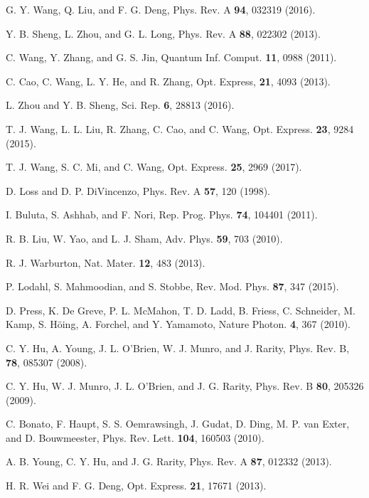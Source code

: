 \documentclass[aps,graphicx,twocolumn]{revtex4}%
\begin{document}
\begin{thebibliography}{199}
 G. Y. Wang, Q. Liu, and F. G. Deng,   Phys. Rev. A \textbf{94}, 032319 (2016).



Y. B. Sheng, L. Zhou, and G. L. Long,   Phys. Rev. A \textbf{88}, 022302 (2013).


C. Wang, Y. Zhang, and G. S. Jin,   Quantum Inf. Comput. \textbf{11}, 0988 (2011).


 C. Cao, C. Wang,  L. Y. He, and R. Zhang,    Opt. Express, \textbf{21}, 4093 (2013).

L. Zhou and Y. B. Sheng, Sci. Rep. \textbf{6}, 28813 (2016).

 T. J. Wang,  L. L. Liu,  R. Zhang, C. Cao, and  C. Wang,   Opt. Express. \textbf{23}, 9284 (2015).

T. J. Wang,  S. C. Mi, and C.  Wang,    Opt. Express. \textbf{25}, 2969  (2017).


D. Loss and  D. P. DiVincenzo,    Phys. Rev.  A \textbf{57}, 120 (1998).

I. Buluta, S. Ashhab, and F. Nori,   Rep. Prog. Phys. \textbf{74}, 104401  (2011).


R. B. Liu,  W.  Yao, and L. J. Sham,    Adv. Phys. \textbf{59}, 703 (2010).

R. J. Warburton,    Nat. Mater. \textbf{12}, 483 (2013).

P. Lodahl, S. Mahmoodian, and S. Stobbe,    Rev. Mod. Phys. \textbf{87}, 347  (2015).

D. Press,  K. De Greve, P. L. McMahon, T. D. Ladd, B. Friess,  C. Schneider, M. Kamp,  S. H\"{o}ing,   A. Forchel, and  Y. Yamamoto,   Nature Photon. \textbf{4}, 367 (2010).


C. Y. Hu, A. Young, J. L. O'Brien,  W. J. Munro, and  J. Rarity,    Phys. Rev.  B, \textbf{78}, 085307 (2008).

C. Y. Hu, W. J. Munro, J. L. O'Brien, and J. G. Rarity,  Phys. Rev.  B \textbf{80}, 205326 (2009).

 C. Bonato, F. Haupt,  S. S. Oemrawsingh,  J. Gudat,  D. Ding,  M. P. van Exter, and  D. Bouwmeester,    Phys. Rev. Lett. \textbf{104}, 160503 (2010).

 A. B. Young,  C. Y. Hu, and J. G. Rarity,     Phys. Rev.  A \textbf{87}, 012332 (2013).

H. R. Wei and F. G.  Deng,    Opt. Express. \textbf{21}, 17671 (2013).


\end{thebibliography}
\end{document}
